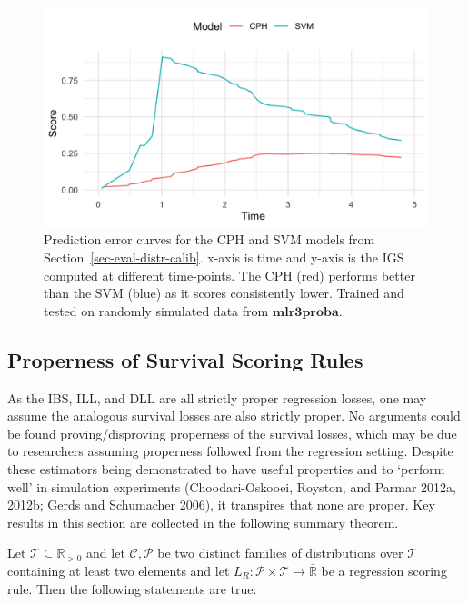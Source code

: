 \documentclass[
  letterpaper,
]{scrbook}
\theoremstyle{plain}
\theoremstyle{definition}
\theoremstyle{remark}
\begin{document}
\begin{figure}

{\centering \includegraphics{./images/evaluation/pecs.png}

}

\caption{\label{fig-eval-eval-pecs}Prediction error curves for the CPH
and SVM models from Section~\ref{sec-eval-distr-calib}. x-axis is time
and y-axis is the IGS computed at different time-points. The CPH (red)
performs better than the SVM (blue) as it scores consistently lower.
Trained and tested on randomly simulated data from
\(\textbf{mlr3proba}\).}

\end{figure}

\hypertarget{sec-eval-distr-score-proper}{%
\subsection{Properness of Survival Scoring
Rules}\label{sec-eval-distr-score-proper}}

As the IBS, ILL, and DLL are all strictly proper regression losses, one
may assume the analogous survival losses are also strictly proper. No
arguments could be found proving/disproving properness of the survival
losses, which may be due to researchers assuming properness followed
from the regression setting. Despite these estimators being demonstrated
to have useful properties and to `perform well' in simulation
experiments (Choodari-Oskooei, Royston, and Parmar 2012a, 2012b; Gerds
and Schumacher 2006), it transpires that none are proper. Key results in
this section are collected in the following summary theorem.

\leavevmode{}%
Let \(\mathcal{T}\subseteq \mathbb{R}_{>0}\) and let
\(\mathcal{C},\mathcal{P}\) be two distinct families of distributions
over \(\mathcal{T}\) containing at least two elements and let
\(L_R: \mathcal{P}\times \mathcal{T}\rightarrow \bar{\mathbb{R}}\) be a
regression scoring rule. Then the following statements are true:
\end{document}
